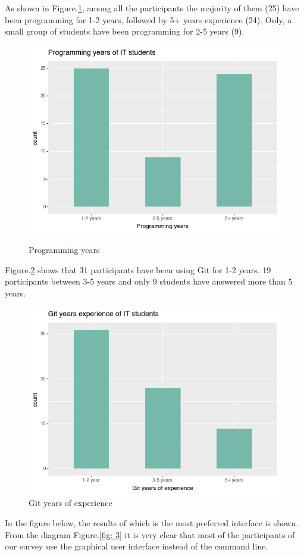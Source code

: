 \documentclass[]{report}
\begin{document}
	As shown in Figure.\ref{fig: 1}, among all the participants the majority of them (25) have been programming for 1-2 years, followed by 5+ years experience (24). Only, a small group of students have been programming for 2-5 years (9).
	
	\begin{figure}[H]
		\centering
		\includegraphics[width=0.75\linewidth]{ProgrammingYears}\\
		\caption{Programming years}
		\label{fig: 1}
	\end{figure}
	
	Figure.\ref{fig: 2} shows that 31 participants have been using Git for 1-2 years. 19 participants between 3-5 years and only 9 students have answered more than 5 years.
		
	\begin{figure}[H]
		\centering
		\includegraphics[width=0.75\linewidth]{GitYearsExperience}
		\caption{Git years of experience}
		\label{fig: 2}
	\end{figure}
	
	In the figure below, the results of which is the most preferred interface is shown. From the diagram Figure.\ref{fig: 3} it is very clear that most of the participants of our survey use the graphical user interface instead of the command line.
	
\end{document}
